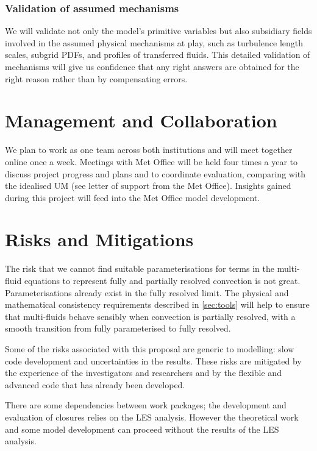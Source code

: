 \documentclass[11pt,a4paper]{article}
\begin{document}
\subsubsection*{Validation of assumed mechanisms}

We will validate not only the model's primitive variables but also subsidiary fields involved in the assumed physical mechanisms at play, such as turbulence length scales, subgrid PDFs, and profiles of transferred fluids. This detailed validation of mechanisms will give us confidence that any right answers are obtained for the right reason rather than by compensating errors.

\section{Management and Collaboration}

We plan to work as one team across both institutions and will meet together online once a week. Meetings with Met Office will be held four times a year to discuss project progress and plans and to coordinate evaluation, comparing with the idealised UM (see letter of support from the Met Office). Insights gained during this project will feed into the Met Office model development.

\section{Risks and Mitigations}

The risk that we cannot find suitable parameterisations for terms in the multi-fluid equations to represent fully and partially resolved convection is not great. Parameterisations already exist in the fully resolved limit. The physical and mathematical consistency requirements described in \ref{sec:tools} will help to ensure that multi-fluids behave sensibly when convection is partially resolved, with a smooth transition from fully parameterised to fully resolved.

Some of the risks associated with this proposal are generic to modelling: slow code development and uncertainties in the results. These risks are mitigated by the experience of the investigators and researchers and by the flexible and advanced code that has already been developed.

There are some dependencies between work packages; the development and evaluation of closures relies on the LES analysis. However the theoretical work and some model development can proceed without the results of the LES analysis.

\renewcommand\refname{References (not included in Track Record)}

%

\end{document}
